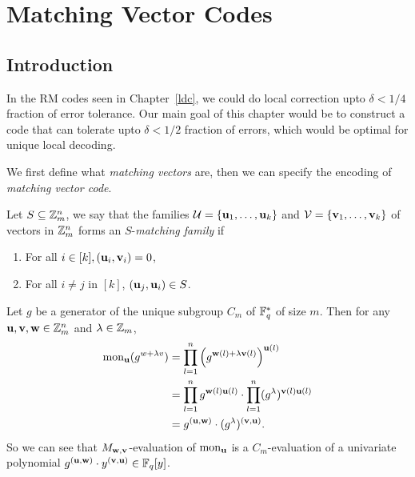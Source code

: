 \chapter{Matching Vector Codes}

\section{Introduction}

In the RM codes seen in Chapter~\ref{ldc}, we could do local correction upto $\delta<1/4$ fraction of error tolerance. Our main goal of this chapter would be to construct a code that can tolerate upto $\delta<1/2$ fraction of errors, which would be optimal for unique local decoding.

We first define what \emph{matching vectors} are, then we can specify the encoding of \emph{matching vector code}.

  \begin{definition}\label{mvf}
    Let $S\subseteq\mathbb{Z}_{m}^n$, we say that the families $\mathcal{U} = \{\mathbf{u}_1, \ldots, \mathbf{u}_k\}$ and $\mathcal{V} = \{\mathbf{v}_1,\ldots, \mathbf{v}_k\}$ of vectors in $\mathbb{Z}_m^n$ forms an $S$-\emph{matching family} if 
    \begin{enumerate}
        \item For all $i\in[k], (\mathbf{u}_i, \mathbf{v}_i) = 0$, 
        \item For all $i\neq j$ in $[k]$, $(\mathbf{u}_j, \mathbf{u}_i) \in S$.
    \end{enumerate}
\end{definition}
\begin{observation}
        Let $g$ be a generator of the unique subgroup $C_m$ of $\mathbb{F}_q^*$ of size $m$. Then for any $\mathbf{u},\mathbf{v},\mathbf{w}\in\mathbb{Z}_m^n$ and $\lambda\in\mathbb{Z}_m$, 
        \begin{align*}
            \mathrm{mon}_{\mathbf{u}}(g^{w+\lambda v}) 
            & = \prod_{l=1}^n \left( g^{\mathbf{w}(l) + \lambda \mathbf{v}(l)} \right)^{\mathbf{u}(l)} \\
            & = \prod_{l=1}^n g^{\mathbf{w}(l)\mathbf{u}(l)}\cdot\prod_{l=1}^n(g^{\lambda})^{\mathbf{v}(l)\mathbf{u}(l)} \\
            & = g^{(\mathbf{u}, \mathbf{w})}\cdot (g^{\lambda})^{(\mathbf{v}, \mathbf{u})}.
        \end{align*}
        So we can see that $M_{\mathbf{w}, \mathbf{v}}$-evaluation of $\mathrm{mon}_{\mathbf{u}}$ is a $C_m$-evaluation of a univariate polynomial $g^{(\mathbf{u}, \mathbf{w})}\cdot y^{(\mathbf{v}, \mathbf{u})}\in\mathbb{F}_q[y]$.
    \end{observation}

